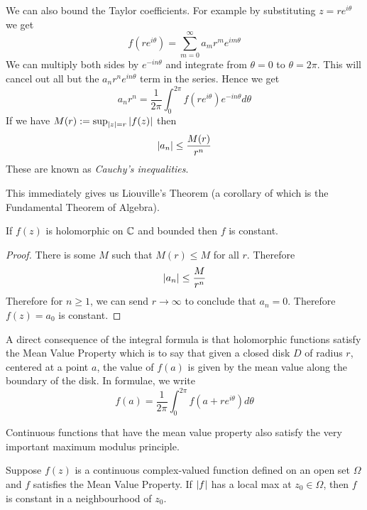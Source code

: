 We can also bound the Taylor coefficients. For example by substituting $z = re^{i \theta}$ we get
$$f(re^{i \theta}) = \sum_{m = 0}^\infty a_m r^m e^{im \theta}$$
We can multiply both sides by $e^{-in \theta}$ and integrate from $\theta = 0$ to $\theta = 2\pi$. This will cancel out all but the $a_n r^n e^{i n \theta}$ term in the series. Hence we get
$$a_n r^n = \frac{1}{2\pi} \int_0^{2\pi} f(re^{i \theta}) e^{-in \theta} d\theta$$
If we have $M(r) := \sup_{\left|z\right| = r} \left|f(z)\right|$ then
$$\left|a_n\right| \leq \frac{M(r)}{r^n}$$
These are known as \textit{Cauchy's inequalities}.

This immediately gives us Liouville's Theorem (a corollary of which is the Fundamental Theorem of Algebra).
\begin{theorem}
    If $f(z)$ is holomorphic on $\mathbb{C}$ and bounded then $f$ is constant.
\end{theorem}
\begin{proof}
    There is some $M$ such that $M(r) \leq M$ for all $r$. Therefore
    $$\left|a_n\right| \leq \frac{M}{r^n}$$
    Therefore for $n \geq 1$, we can send $r \to \infty$ to conclude that $a_n = 0$. Therefore $f(z) = a_0$ is constant.
\end{proof}

A direct consequence of the integral formula is that holomorphic functions satisfy the Mean Value Property which is to say that given a closed disk $D$ of radius $r$, centered at a point $a$, the value of $f(a)$ is given by the mean value along the boundary of the disk. In formulae, we write
$$f(a) = \frac{1}{2\pi} \int_{0}^{2 \pi} f(a + re^{i \theta}) d\theta $$

Continuous functions that have the mean value property also satisfy the very important maximum modulus principle.
\begin{theorem}\label{thm:max-mod-prin}
    Suppose $f(z)$ is a continuous complex-valued function defined on an open set $\Omega$ and $f$ satisfies the Mean Value Property. If $\left|f\right|$ has a local max at $z_0 \in \Omega$, then $f$ is constant in a neighbourhood of $z_0$.
\end{theorem}

